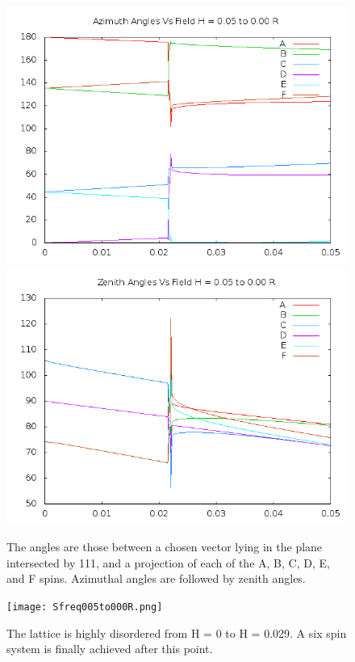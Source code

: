 \documentclass{article}
\begin{document}
\begin{figure}
\centering
\includegraphics[scale=0.5]{azim005to000R.png}
\includegraphics[scale=0.5]{zen005to000R.png}
\caption{The angles are those between a chosen vector lying in the plane intersected by 111,
and a projection of each of the A, B, C, D, E, and F spins. Azimuthal angles are followed by zenith angles.}
\end{figure}

\begin{center}
\begin{figure}
 \texttt{[image: Sfreq005to000R.png]}
 \caption{The lattice is highly disordered from H = 0 to H = 0.029. A six spin system is finally achieved after
 this point.}
\end{figure}
\end{center}
\end{document}
